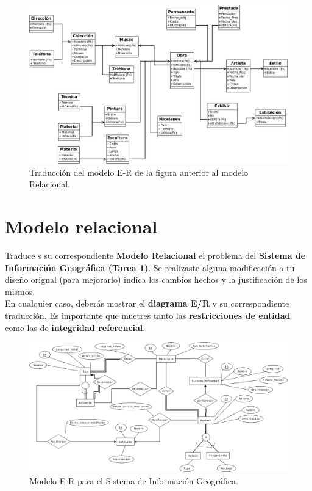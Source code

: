 \documentclass{article}
\begin{document}
    \begin{figure}[H]
    	\begin{center}
    		\includegraphics[width=1\textwidth]{MRProblema2.jpeg}
    	\end{center}
    	\caption{Traducción del modelo E-R de la figura anterior al modelo Relacional.}
    \end{figure}
        
    \section{Modelo relacional}
    Traduce s su correspondiente \textbf{Modelo Relacional} el problema del 
    \textbf{Sistema de Información Geográfica (Tarea 1)}. Se realizaste alguna
    modificación a tu diseño orignal (para mejorarlo) indica los cambios hechos 
    y la justificación de los mismos.\\
    En cualquier caso, deberás mostrar el \textbf{diagrama E/R} y su
    correspondiente traducción. Es importante que muetres tanto las 
    \textbf{restricciones de entidad} como las de \textbf{integridad referencial}.
    
    \begin{figure}[H]
    	\begin{center}
    		\includegraphics[width=1\textwidth]{2b.png}
    	\end{center}
    	\caption{Modelo E-R para el Sistema de Información Geográfica.}
    \end{figure}
    
\end{document}
